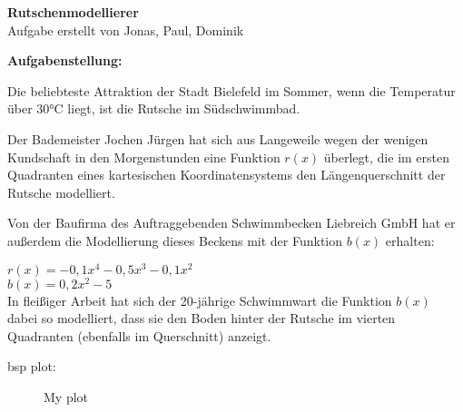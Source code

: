\documentclass{article}
\begin{document}
\begin{center}
    \huge \textbf{Rutschenmodellierer}\\
    \footnotesize{Aufgabe erstellt von Jonas, Paul, Dominik}
\end{center}

\vspace{1.5cm}

\textbf{Aufgabenstellung:}

\vspace{0.2cm}

Die beliebteste Attraktion der Stadt Bielefeld im Sommer, wenn die Temperatur über 30°C liegt, ist die Rutsche im Südschwimmbad.

Der Bademeister Jochen Jürgen hat sich aus Langeweile wegen der wenigen Kundschaft in den Morgenstunden eine Funktion $r(x)$ überlegt, die im ersten Quadranten eines kartesischen Koordinatensystems den Längenquerschnitt der Rutsche modelliert. 

Von der Baufirma des Auftraggebenden Schwimmbecken Liebreich GmbH hat er außerdem die Modellierung dieses Beckens mit der Funktion $b(x)$ erhalten:\\

\vspace{0.2cm}

$r(x) = -0,1x^4 - 0,5x^3 - 0,1x^2$ \\

$b(x) = 0,2x^2 - 5$\\

In fleißiger Arbeit hat sich der 20-jährige Schwimmwart die Funktion $b(x)$ dabei so modelliert, dass sie den Boden hinter der Rutsche im vierten Quadranten (ebenfalls im Querschnitt) anzeigt.

\vspace{2cm}

bsp plot:\\
\begin{figure}[h]
    \centering
{}

\caption{My plot}
    \label{fig:myplot}
\end{figure}
\end{document}
